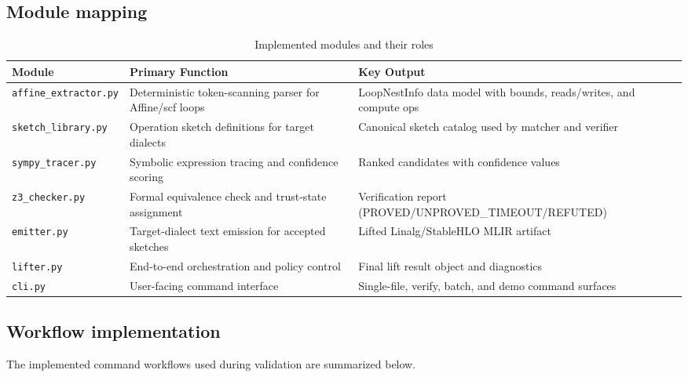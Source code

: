 \subsection*{Module mapping}
\begin{table}[H]
\centering
\caption{Implemented modules and their roles}
\begin{tabular}{|p{3.0cm}|p{4.8cm}|p{7.4cm}|}
\hline
\textbf{Module} & \textbf{Primary Function} & \textbf{Key Output} \\
\hline
\texttt{affine\_extractor.py} & Deterministic token-scanning parser for Affine/scf loops & LoopNestInfo data model with bounds, reads/writes, and compute ops \\
\hline
\texttt{sketch\_library.py} & Operation sketch definitions for target dialects & Canonical sketch catalog used by matcher and verifier \\
\hline
\texttt{sympy\_tracer.py} & Symbolic expression tracing and confidence scoring & Ranked candidates with confidence values \\
\hline
\texttt{z3\_checker.py} & Formal equivalence check and trust-state assignment & Verification report (PROVED/UNPROVED\_TIMEOUT/REFUTED) \cite{z3} \\
\hline
\texttt{emitter.py} & Target-dialect text emission for accepted sketches & Lifted Linalg/StableHLO MLIR artifact \cite{stablehlo} \\
\hline
\texttt{lifter.py} & End-to-end orchestration and policy control & Final lift result object and diagnostics \\
\hline
\texttt{cli.py} & User-facing command interface & Single-file, verify, batch, and demo command surfaces \\
\hline
\end{tabular}
\end{table}

\subsection*{Workflow implementation}
The implemented command workflows used during validation are summarized below.

